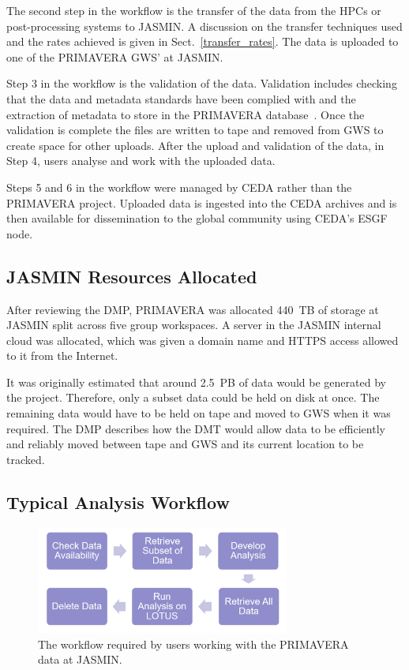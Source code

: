 \documentclass[gmd, manuscript]{copernicus}
\begin{document}
The second step in the workflow is the transfer of the data from the HPCs or post-processing systems to JASMIN. A discussion on the transfer techniques used and the rates achieved is given in Sect.~\ref{transfer_rates}. The data is uploaded to one of the PRIMAVERA GWS' at JASMIN.

Step 3 in the workflow is the validation of the data. Validation includes checking that the data and metadata standards have been complied with and the extraction of metadata to store in the PRIMAVERA database~\citep{Seddon2020}. Once the validation is complete the files are written to tape and removed from GWS to create space for other uploads. After the upload and validation of the data, in Step 4, users analyse and work with the uploaded data. 

Steps 5 and 6 in the workflow were managed by CEDA rather than the PRIMAVERA project. Uploaded data is ingested into the CEDA archives and is then available for dissemination to the global community using CEDA's ESGF node.


\subsection{JASMIN Resources Allocated}

After reviewing the DMP, PRIMAVERA was allocated 440~TB of storage at JASMIN split across  five group workspaces. A server in the JASMIN internal cloud was allocated, which was given a domain name and  HTTPS access allowed to it from the Internet.

It was originally estimated that around 2.5~PB of data would be generated by the project. Therefore, only a subset data could be held on disk at once. The remaining data would have to be held on tape and moved to GWS when it was required. The DMP describes how the DMT would allow data to be efficiently and reliably moved between tape and GWS and its current location to be tracked.

\subsection{Typical Analysis Workflow}

\begin{figure}[t]
	\includegraphics[width=8.3cm]{fig02.png}
	\caption{The workflow required by users working with the PRIMAVERA data at JASMIN.}
	\label{analysis_workflow}
\end{figure}
\end{document}
